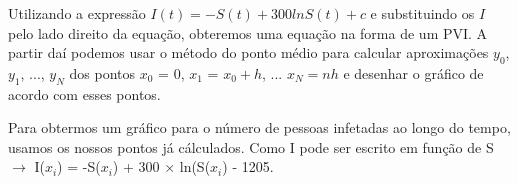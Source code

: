 \documentclass[portuguese, a4paper]{article}
\begin{document}





		\subsubsection{}
		\par

		Utilizando a expressão $I(t) = -S(t) + 300 ln S(t) + c$ e substituindo
		os $I$ pelo lado direito da equação, obteremos uma equação na forma de um
		PVI. A partir daí podemos usar o método do ponto médio para calcular aproximações $y_0$, $y_1$, ..., $y_N$ dos pontos
		$x_0$ = 0, $x_1$ = $x_0 + h$, ... $x_N= nh$ e desenhar o gráfico de acordo com esses pontos.

		Para obtermos um gráfico para o número de pessoas infetadas ao longo do tempo, usamos os nossos
		pontos já cálculados.
		Como I pode ser escrito em função de S $\rightarrow$
		I($x_i$) = -S($x_i$) + 300 $\times$ ln(S($x_i$) - 1205.
\end{document}
